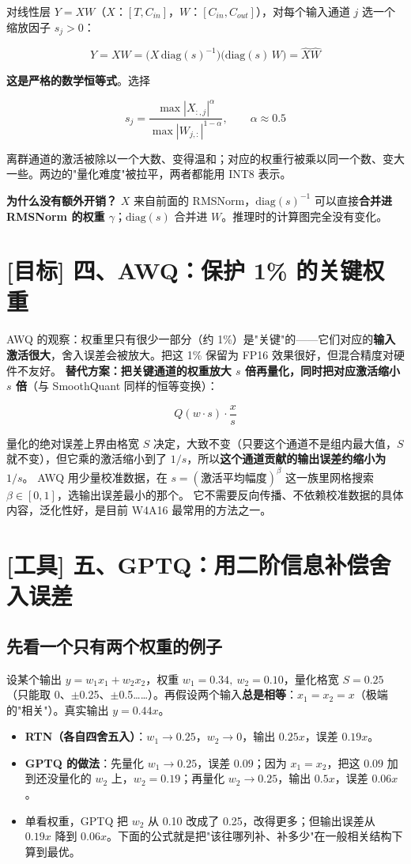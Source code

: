 对线性层 $Y = XW$（$X$：$[T, C_{in}]$，$W$：$[C_{in}, C_{out}]$），对每个输入通道 $j$ 选一个缩放因子 $s_j > 0$：

\[
Y = XW = \big(X \, \text{diag}(s)^{-1}\big) \big(\text{diag}(s) \, W\big) = \hat{X} \hat{W}
\]

\textbf{这是严格的数学恒等式}。选择

\[
s_j = \frac{\max |X_{:,j}|^{\alpha}}{\max |W_{j,:}|^{1-\alpha}}, \qquad \alpha \approx 0.5
\]

离群通道的激活被除以一个大数、变得温和；对应的权重行被乘以同一个数、变大一些。两边的"量化难度"被拉平，两者都能用 INT8 表示。

\textbf{为什么没有额外开销？} $X$ 来自前面的 RMSNorm，$\text{diag}(s)^{-1}$ 可以直接\textbf{合并进 RMSNorm 的权重 $\gamma$}；$\text{diag}(s)$ 合并进 $W$。推理时的计算图完全没有变化。

\section{[目标] 四、AWQ：保护 1\% 的关键权重}

AWQ 的观察：权重里只有很少一部分（约 1\%）是"关键"的——它们对应的\textbf{输入激活很大}，舍入误差会被放大。把这 1\% 保留为 FP16 效果很好，但混合精度对硬件不友好。
\textbf{替代方案：把关键通道的权重放大 $s$ 倍再量化，同时把对应激活缩小 $s$ 倍}（与 SmoothQuant 同样的恒等变换）：

\[
Q(w \cdot s) \cdot \frac{x}{s}
\]

量化的绝对误差上界由格宽 $S$ 决定，大致不变（只要这个通道不是组内最大值，$S$ 就不变），但它乘的激活缩小到了 $1/s$，所以\textbf{这个通道贡献的输出误差约缩小为 $1/s$}。
AWQ 用少量校准数据，在 $s = (\text{激活平均幅度})^{\beta}$ 这一族里网格搜索 $\beta \in [0, 1]$，选输出误差最小的那个。
它不需要反向传播、不依赖校准数据的具体内容，泛化性好，是目前 W4A16 最常用的方法之一。

\section{[工具] 五、GPTQ：用二阶信息补偿舍入误差}

\subsection{先看一个只有两个权重的例子}

设某个输出 $y = w_1 x_1 + w_2 x_2$，权重 $w_1 = 0.34,\ w_2 = 0.10$，量化格宽 $S = 0.25$（只能取 0、$\pm$0.25、$\pm$0.5\dots{}\dots{}）。再假设两个输入\textbf{总是相等}：$x_1 = x_2 = x$（极端的"相关"）。真实输出 $y = 0.44x$。
\begin{itemize}
  \item \textbf{RTN（各自四舍五入）}：$w_1 \to 0.25$，$w_2 \to 0$，输出 $0.25x$，误差 $0.19x$。
  \item \textbf{GPTQ 的做法}：先量化 $w_1 \to 0.25$，误差 $0.09$；因为 $x_1 = x_2$，把这 $0.09$ 加到还没量化的 $w_2$ 上，$w_2 = 0.19$；再量化 $w_2 \to 0.25$，输出 $0.5x$，误差 $0.06x$。
  \item 单看权重，GPTQ 把 $w_2$ 从 0.10 改成了 0.25，改得更多；但输出误差从 $0.19x$ 降到 $0.06x$。下面的公式就是把"该往哪列补、补多少"在一般相关结构下算到最优。
\end{itemize}

